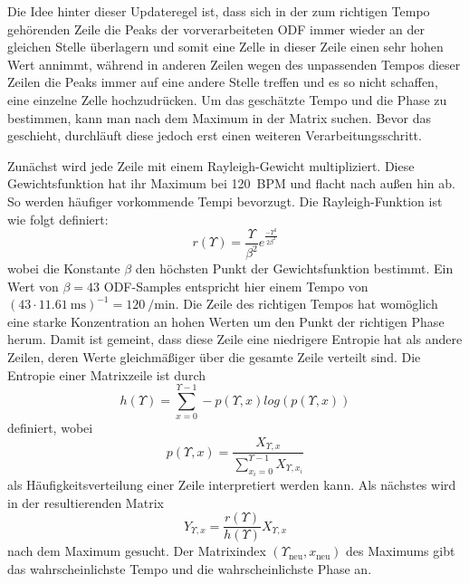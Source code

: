 {{{			%
			Die Idee hinter dieser Updateregel ist,
				dass sich in der zum richtigen Tempo gehörenden Zeile
				die Peaks der vorverarbeiteten ODF immer wieder an der gleichen Stelle überlagern
				und somit eine Zelle in dieser Zeile einen sehr hohen Wert annimmt,
				während in anderen Zeilen
				wegen des unpassenden Tempos dieser Zeilen
				die Peaks immer auf eine andere Stelle treffen
				und es so nicht schaffen,
				eine einzelne Zelle hochzudrücken.
			Um das geschätzte Tempo und die Phase zu bestimmen,
				kann man nach dem Maximum in der Matrix suchen.
			Bevor das geschieht,
				durchläuft diese jedoch erst einen weiteren Verarbeitungsschritt.

			Zunächst wird jede Zeile mit einem Rayleigh-Gewicht multipliziert.
			Diese Gewichtsfunktion hat ihr Maximum bei \SI{120}{BPM} und flacht nach au{\ss}en hin ab.
			So werden häufiger vorkommende Tempi bevorzugt.
			Die Rayleigh-Funktion ist wie folgt definiert:
			\begin{equation}
				r(\Upsilon) = \frac{\Upsilon}{\beta^2}e^{\frac{-\Upsilon^2}{2\beta^2}}
			\end{equation}
			wobei die Konstante $\beta$ den höchsten Punkt der Gewichtsfunktion bestimmt.
			Ein Wert von $\beta = 43$ ODF-Samples entspricht hier einem Tempo von
				$(43 \cdot \SI{11.61}{\milli\second})^{-1} = \SI{120}{\per\minute}$.
			Die Zeile des richtigen Tempos hat womöglich eine starke Konzentration an hohen Werten um den Punkt der richtigen Phase herum.
			Damit ist gemeint,
				dass diese Zeile eine niedrigere Entropie hat als andere Zeilen,
				deren Werte gleichmä{\ss}iger über die gesamte Zeile verteilt sind.
			Die Entropie einer Matrixzeile ist durch
				\begin{equation}
					h(\Upsilon) = \sum_{x = 0}^{\Upsilon - 1} -p(\Upsilon, x) log(p(\Upsilon, x))
				\end{equation}
				definiert, wobei
				\begin{equation}
					p(\Upsilon, x) = \frac{X_{\Upsilon, x}}{\sum_{x_i = 0}^{\Upsilon - 1}X_{\Upsilon, x_i}}
				\end{equation}
				als Häufigkeitsverteilung einer Zeile interpretiert werden kann.
			Als nächstes wird in der resultierenden Matrix
				\begin{equation}
					Y_{\Upsilon, x} = \frac{r(\Upsilon)}{h(\Upsilon)}X_{\Upsilon, x}
				\end{equation}
				nach dem Maximum gesucht.
			Der Matrixindex $(\Upsilon_{\text{neu}}, x_{\text{neu}})$ des Maximums gibt das wahrscheinlichste Tempo und die wahrscheinlichste Phase an.

}}}
